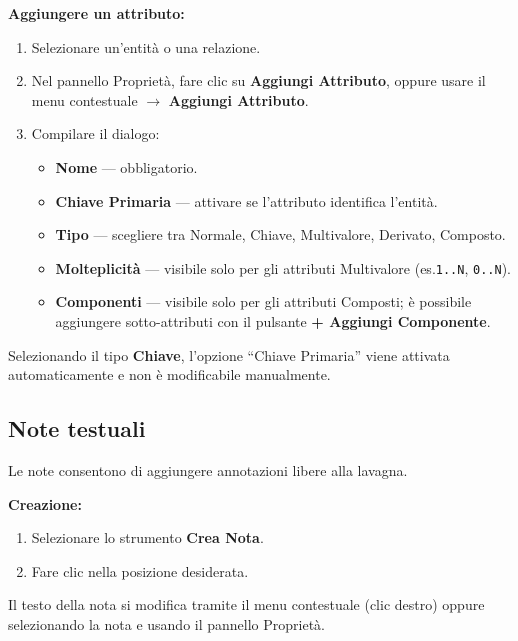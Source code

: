 \documentclass[a4paper,11pt]{article}
\newcommand{\uielement}[1]{\textbf{#1}}
\begin{document}
\textbf{Aggiungere un attributo:}
\begin{enumerate}
  \item Selezionare un'entità o una relazione.
  \item Nel pannello Proprietà, fare clic su \uielement{Aggiungi Attributo}, oppure usare il
        menu contestuale $\to$ \uielement{Aggiungi Attributo}.
  \item Compilare il dialogo:
        \begin{itemize}
          \item \textbf{Nome} --- obbligatorio.
          \item \textbf{Chiave Primaria} --- attivare se l'attributo identifica l'entità.
          \item \textbf{Tipo} --- scegliere tra Normale, Chiave, Multivalore, Derivato, Composto.
          \item \textbf{Molteplicità} --- visibile solo per gli attributi Multivalore
                (es.\@ \texttt{1..N}, \texttt{0..N}).
          \item \textbf{Componenti} --- visibile solo per gli attributi Composti; è possibile
                aggiungere sotto-attributi con il pulsante \uielement{+ Aggiungi Componente}.
        \end{itemize}
\end{enumerate}

\begin{tcolorbox}[notebox, title={Nota}]
  Selezionando il tipo \textbf{Chiave}, l'opzione ``Chiave Primaria'' viene attivata
  automaticamente e non è modificabile manualmente.
\end{tcolorbox}

\subsection{Note testuali}

Le note consentono di aggiungere annotazioni libere alla lavagna.

\textbf{Creazione:}
\begin{enumerate}
  \item Selezionare lo strumento \uielement{Crea Nota}.
  \item Fare clic nella posizione desiderata.
\end{enumerate}

Il testo della nota si modifica tramite il menu contestuale (clic destro) oppure
selezionando la nota e usando il pannello Proprietà.
\end{document}
